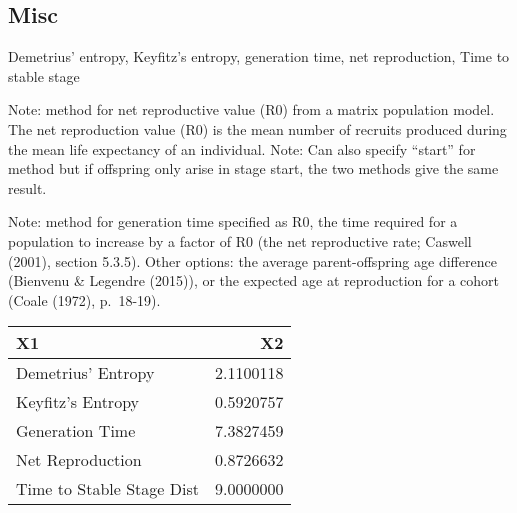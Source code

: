 \documentclass[
]{article}
\begin{document}
\newpage

\hypertarget{misc}{%
\subsection{Misc}\label{misc}}

Demetrius' entropy, Keyfitz's entropy, generation time, net
reproduction, Time to stable stage

Note: method for net reproductive value (R0) from a matrix population
model. The net reproduction value (R0) is the mean number of recruits
produced during the mean life expectancy of an individual. Note: Can
also specify ``start'' for method but if offspring only arise in stage
start, the two methods give the same result.

Note: method for generation time specified as R0, the time required for
a population to increase by a factor of R0 (the net reproductive rate;
Caswell (2001), section 5.3.5). Other options: the average
parent-offspring age difference (Bienvenu \& Legendre (2015)), or the
expected age at reproduction for a cohort (Coale (1972), p.~18-19).

\begin{tabular}{lr}
\toprule
X1 & X2\\
\midrule
Demetrius’ Entropy & 2.1100118\\
Keyfitz’s Entropy & 0.5920757\\
Generation Time & 7.3827459\\
Net Reproduction & 0.8726632\\
Time to Stable Stage Dist & 9.0000000\\
\bottomrule
\end{tabular}
\end{document}
